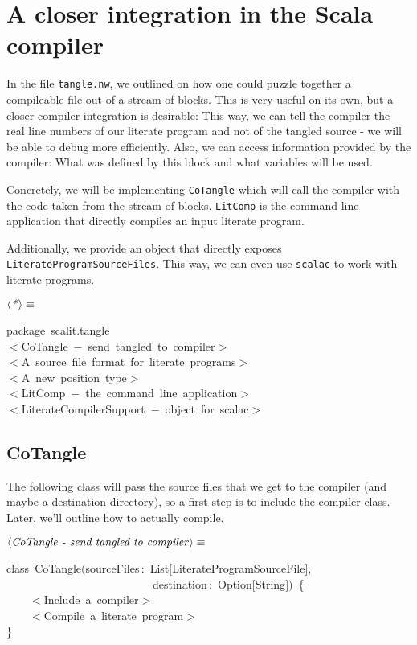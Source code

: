 \documentclass[a4paper,12pt]{article}
\begin{document}
\section{A closer integration in the Scala compiler}
In the file \texttt{tangle.nw}, we outlined on how one could puzzle together a
compileable file out of a stream of blocks. This is very useful on its own,
but a closer compiler integration is desirable: This way, we can tell the
compiler the real line numbers of our literate program and not of the tangled
source - we will be able to debug more efficiently. Also, we can access
information provided by the compiler: What was defined by this block and
what variables will be used.

Concretely, we will be implementing \texttt{CoTangle} which will call the
compiler with the code taken from the stream of blocks. \texttt{LitComp} is
the command line application that directly compiles an input literate
program.

Additionally, we provide an object that directly exposes
\texttt{LiterateProgramSourceFiles}. This way, we can even use \texttt{scalac} to
work with literate programs.

$\left<\mbox{\emph{*}}\right>\equiv$
\begin{program}{\vem package}~scalit.tangle
\\[0.5em]$<$CoTangle~$-$~send~tangled~to~compiler$>$
\\[0.5em]$<$A~source~file~format~{\vem for}~literate~programs$>$
\\[0.5em]$<$A~{\vem new}~position~{\vem type}$>$
\\[0.5em]$<$LitComp~$-$~the~command~line~application$>$
\\[0.5em]$<$LiterateCompilerSupport~$-$~{\vem object}~{\vem for}~scalac$>$
\\[0.5em]\end{program}


\subsection{CoTangle}
The following class will pass the source files that we get to the compiler (and
maybe a destination directory),
so a first step is to include the compiler class. Later, we'll outline
how to actually compile.

$\left<\mbox{\emph{CoTangle - send tangled to compiler}}\right>\equiv$
\begin{program}{\vem class}~CoTangle$($sourceFiles\,{\rm :}~List$[$LiterateProgramSourceFile$]$,
\\~~~~~~~~~~~~~~~~~~~~~~~~~~destination\,{\rm :}~Option$[$String$]$$)$~{\small\{}
\\~~~~$<$Include~a~compiler$>$
\\~~~~$<$Compile~a~literate~program$>$
\\{\small\}}
\\[0.5em]\end{program}
\end{document}
